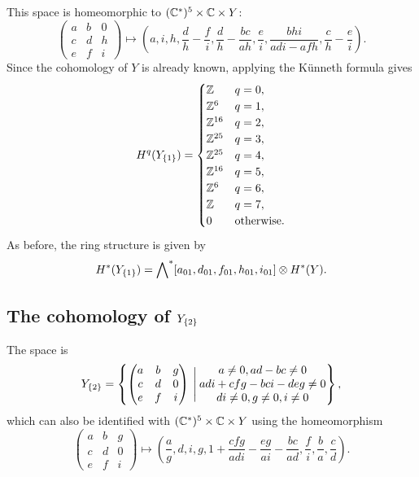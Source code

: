 This space is homeomorphic to $(\mathbb{C}^*)^5 \times \mathbb{C}\times Y$:
\[ \begin{pmatrix}
  a & b & 0 \\
  c & d & h \\
  e & f & i
\end{pmatrix} \mapsto \left(
a, i, h, \frac{d}{h}-\frac{f}{i}, \frac{d}{h}-\frac{bc}{ah},
\frac{e}{i}, \frac{bhi}{adi-afh},\frac{c}{h}-\frac{e}{i}
\right). \] 
Since the cohomology of $Y$ is already known, applying the K\"unneth
formula gives
\[ H^q(Y_{\left\{ 1 \right\}}) =
\begin{cases}
  \mathbb{Z} & q = 0, \\
  \mathbb{Z}^6 & q = 1, \\
  \mathbb{Z}^{16} & q = 2, \\
  \mathbb{Z}^{25} & q = 3, \\
  \mathbb{Z}^{25} & q = 4, \\
  \mathbb{Z}^{16} & q = 5, \\
  \mathbb{Z}^6 & q = 6, \\
  \mathbb{Z} & q = 7, \\
  0 & \text{otherwise}.
\end{cases} \] 
As before, the ring structure is given by
\[ H^*(Y_{\left\{ 1 \right\}}) =
\bigwedge\nolimits^*[a_{01},d_{01},f_{01},h_{01},i_{01}] \otimes H^*(Y).\]

\subsection{The cohomology of $Y_{\left\{ 2 \right\}}$}

The space is
\[ Y_{\left\{ 2 \right\}} = \left\{ 
  \begin{pmatrix}
    a & b & g \\
    c & d & 0 \\
    e & f & i
  \end{pmatrix} \:\Bigg\vert\:
  \begin{matrix}
    a \neq 0, ad-bc \neq 0 \\
    adi +cfg -bci - deg \neq 0 \\
    di \neq 0, g\neq 0, i \neq 0 \end{matrix}
 \right\}, \]
which can also be identified with $(\mathbb{C}^*)^5\times \mathbb{C}\times Y$ using
the homeomorphism
\[ \begin{pmatrix}
  a & b & g \\
  c & d & 0 \\
  e & f & i
\end{pmatrix} \mapsto \left(\frac{a}{g},d,i,g, 1+\frac{cfg}{adi}-
  \frac{eg}{ai}-\frac{bc}{ad}, \frac{f}{i},\frac{b}{a}, \frac{c}{d}
\right).\]

